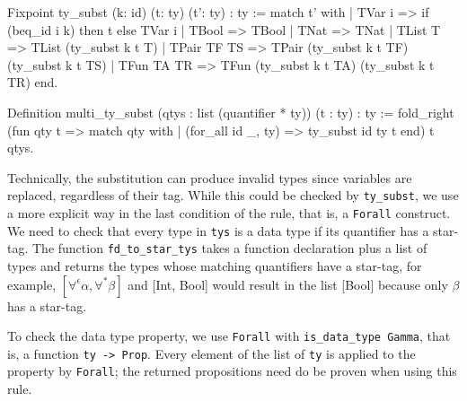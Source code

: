 \documentclass[paper = a4, fleqn, abstract=on, twoside]{scrreprt}
\newcommand{\coqinline}[1]{\texttt{#1}}
\begin{document}
\begin{coqcode}
Fixpoint ty_subst (k: id) (t: ty) (t': ty) : ty :=
  match t' with
  | TVar i      =>  if (beq_id i k) then t else TVar i
  | TBool       => TBool
  | TNat        => TNat
  | TList T     => TList (ty_subst k t T)
  | TPair TF TS => TPair (ty_subst k t TF) (ty_subst k t TS)
  | TFun  TA TR => TFun  (ty_subst k t TA) (ty_subst k t TR)
  end.
\end{coqcode}
\begin{coqcode}
Definition multi_ty_subst (qtys : list (quantifier * ty)) (t : ty) : ty := 
  fold_right (fun qty t => match qty with 
                           | (for_all id _, ty) => ty_subst id ty t
                           end)
              t qtys.
\end{coqcode}
Technically, the substitution can produce invalid types since variables are replaced, regardless of their tag. While this could be checked by \texttt{ty\_subst}, we use a more explicit way in the last condition of the rule, that is, a \coqinline{Forall} construct. We need to check that every type in \coqinline{tys} is a data type if its quantifier has a star-tag. The function \coqinline{fd_to_star_tys} takes a function declaration plus a list of types and returns the types whose matching quantifiers have a star-tag, for example, $[\forall^{\epsilon}\alpha, \forall^{*}\beta]$ and [Int, Bool] would result in the list [Bool] because only $\beta$ has a star-tag. 
\par
To check the data type property, we use \coqinline{Forall} with \coqinline{is_data_type Gamma}, that is, a function \coqinline{ty -> Prop}. Every element of the list of \texttt{ty} is applied to the property by \coqinline{Forall}; the returned propositions need do be proven when using this rule.
\end{document}
